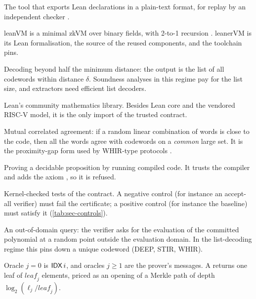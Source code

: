 \begin{description}[leftmargin=0pt,itemsep=2pt,parsep=0pt,font=\normalfont\bfseries]
\item[lean4export.] The tool that exports Lean declarations in a plain-text format, for replay by an
  independent checker \cite{lean4export}.

\item[leanerVM; leanVM.] leanVM is a minimal zkVM over binary fields, with 2-to-1 recursion
  \cite{leanVM}. leanerVM is its Lean formalisation, the source of the reused components,
   and the toolchain pins.

\item[List decoding.] Decoding beyond half the minimum distance: the output is the list of all
  codewords within distance $\delta$. Soundness analyses in this regime pay for the list size, and
  extractors need efficient list decoders.

\item[Mathlib.] Lean's community mathematics library. Besides Lean core and the vendored RISC-V
  model, it is the only import of the trusted contract.

\item[MCA.] Mutual correlated agreement: if a random linear combination of words is close to the
  code, then all the words agree with codewords on a \emph{common} large set. It is the
  proximity-gap form used by WHIR-type protocols \cite{ACFY24-WHIR,BCGM25-MCA}.

\item[native\_decide.] Proving a decidable proposition by running compiled code. It trusts the compiler and
  adds the axiom , so it is refused.

\item[Negative and positive controls.] Kernel-checked tests of the contract. A negative control
  (for instance an accept-all verifier) must fail the certificate; a positive control (for instance
  the baseline) must satisfy it (\cref{tab:sec-controls}).

\item[OOD sample.] An out-of-domain query: the verifier asks for the evaluation of the committed
  polynomial at a random point outside the evaluation domain. In the list-decoding regime this pins
  down a unique codeword (DEEP, STIR, WHIR).

\item[Oracle; leaf.] Oracle $j=0$ is $\mathsf{IDX}\,i$, and oracles $j\ge1$ are the prover's messages. A
   returns one leaf of $\mathit{leaf}_j$ elements, priced as an opening of a Merkle path
  of depth $\log_2(\ell_j/\mathit{leaf}_j)$.


\end{description}
